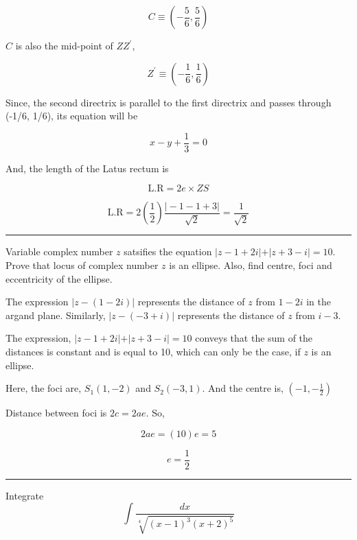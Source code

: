 \documentclass[twocolumn]{article}
\begin{document}
\[
    C \equiv (-\frac{5}{6}, \frac{5}{6})
\]

\(C\) is also the mid-point of \(Z  Z^{\prime} \), 

\[
    Z^{\prime}  \equiv  (-\frac{1}{6}, \frac{1}{6})
\]

Since, the second directrix is parallel to the first directrix and passes through (-1/6, 1/6), its equation will be

\[
    x-y + \frac{1}{3} = 0
\]

And, the length of the Latus rectum is

\[
    \text{L.R} = 2e \times ZS
\]

\[
    \text{L.R} = 2 (\frac{1}{2}) \frac{\vert -1 -1 + 3 \vert }{\sqrt{2} } = \frac{1}{\sqrt{2} }
\]

\hrule 

\begin{question}
    Variable  complex number \(z\) satsifies the equation \(\vert z-1 + 2i \vert + \vert z + 3 - i \vert =  10\). Prove that locus of complex number \(z\) is an ellipse. Also, find centre, foci and eccentricity of the ellipse. 
\end{question}

The expression \(\vert z- (1 - 2i) \vert\) represents the distance of \(z\) from \(1-2i\) in the argand plane. Similarly, \(\vert z - (-3+i) \vert \) represents the distance of \(z\) from \(i-3\). 

\vspace*{0.1in}

The expression, \(\vert z-1+2i \vert + \vert z+3-i \vert = 10 \) conveys that the sum of the distances is constant and is equal to 10, which can only be the case, if \(z\) is an ellipse.  

\vspace*{0.1in}

Here, the foci are, \(S_1 (1, -2)\) and \(S_2 (-3, 1)\). And the centre is, \((-1,-\frac{1}{2})\) 

\vspace*{0.1in}

Distance between foci is \(2c = 2ae\). So, 

\[
    2ae = (10)e =  5
\]

\[
    e = \frac{1}{2}
\]

\hrule 

\begin{question}
    Integrate 
    \[
        \int \frac{dx}{\sqrt[4]{(x-1)^3 (x+2)^5} }
    \]
\end{question}
\end{document}
